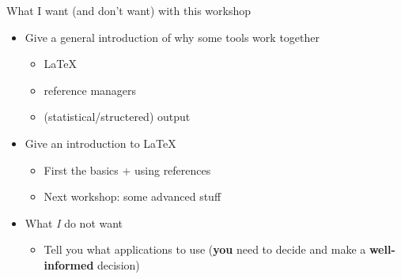 \documentclass[ignorenonframetext]{beamer}
\begin{document}
\begin{frame}{What I want (and don't want) with this workshop}

\begin{itemize}
\item
  Give a general introduction of why some tools work together

  \begin{itemize}
  \item \LaTeX{}
  \item reference managers
  \item (statistical/structered) output
  \end{itemize}
\item
  Give an introduction to \LaTeX{}
  \begin{itemize}
	  \item First the basics + using references
	  \item Next workshop: some advanced stuff
  \end{itemize}
\item
  What \emph{I} do not want

  \begin{itemize}
  \item
    Tell you what applications to use (\textbf{you} need to decide and make a \textbf{well-informed} decision)
  \end{itemize}
\end{itemize}

\end{frame}
\end{document}

